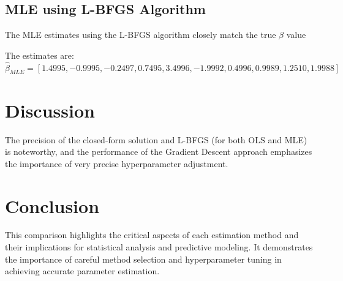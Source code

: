\documentclass[12pt]{article}
\begin{document}
\subsection{MLE using L-BFGS Algorithm}
The MLE estimates using the L-BFGS algorithm closely match the true $\beta$ value

The estimates are:
\[ \hat{\beta}_{MLE}= [1.4995, −0.9995, −0.2497, 0.7495, 3.4996, −1.9992, 0.4996, 0.9989, 1.2510, 1.9988] \]

\section{Discussion}
The precision of the closed-form solution and L-BFGS (for both OLS and MLE) is noteworthy, and the performance of the Gradient Descent approach emphasizes the importance of very precise hyperparameter adjustment. 

\section{Conclusion}
This comparison highlights the critical aspects of each estimation method and their implications for statistical analysis and predictive modeling. It demonstrates the importance of careful method selection and hyperparameter tuning in achieving accurate parameter estimation.
\end{document}
